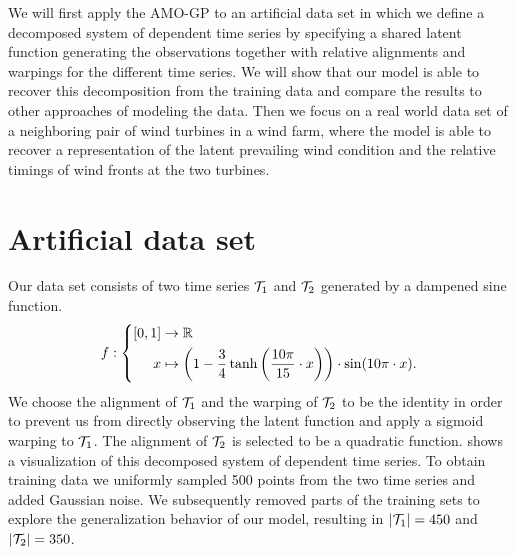 We will first apply the AMO-GP to an artificial data set in which we define a decomposed system of dependent time series by specifying a shared latent function generating the observations together with relative alignments and warpings for the different time series.
We will show that our model is able to recover this decomposition from the training data and compare the results to other approaches of modeling the data.
Then we focus on a real world data set of a neighboring pair of wind turbines in a wind farm, where the model is able to recover a representation of the latent prevailing wind condition and the relative timings of wind fronts at the two turbines.

\section{Artificial data set}
\label{toc:alignment:artificial_example}
Our data set consists of two time series $\mathcal{T}_1$ and $\mathcal{T}_2$ generated by a dampened sine function.
\begin{align}
    f : \left\{ \begin{aligned}
        [0, 1] & \to \Rb                                                                                                          \\
        x      & \mapsto \left( 1 - \frac{3}{4} \tanh \left( \frac{10\pi}{15} \cdot x \right) \right) \cdot \sin (10\pi \cdot x).
    \end{aligned}\right.
\end{align}
We choose the alignment of $\mathcal{T}_1$ and the warping of $\mathcal{T}_2$ to be the identity in order to prevent us from directly observing the latent function and apply a sigmoid warping to $\mathcal{T}_1$.
The alignment of $\mathcal{T}_2$ is selected to be a quadratic function.
 shows a visualization of this decomposed system of dependent time series.
To obtain training data we uniformly sampled 500 points from the two time series and added Gaussian noise.
We subsequently removed parts of the training sets to explore the generalization behavior of our model, resulting in $\vert\mathcal{T}_1\vert= 450$ and $\vert\mathcal{T}_2\vert = 350$.

